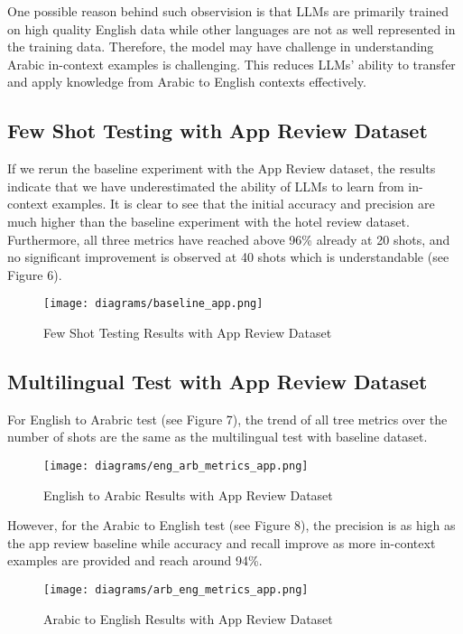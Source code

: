 \documentclass[sigconf, nonacm]{acmart}
\theoremstyle{definition}
\begin{document}
One possible reason behind such observision is that LLMs are primarily trained on high quality English data while other languages are not as well represented in the training data. Therefore, the model may have challenge in understanding Arabic in-context examples is challenging. This reduces LLMs' ability to transfer and apply knowledge from Arabic to English contexts effectively.

\subsection{Few Shot Testing with App Review Dataset}

If we rerun the baseline experiment with the App Review dataset, the results indicate that we have underestimated the ability of LLMs to learn from in-context examples. It is clear to see that the initial accuracy and precision are much higher than the baseline experiment with the hotel review dataset. Furthermore, all three metrics have reached above 96\% already at 20 shots, and no significant improvement is observed at 40 shots which is understandable (see Figure 6).

\begin{figure}[h]
  \centering
  \texttt{[image: diagrams/baseline\_app.png]}
  \caption{Few Shot Testing Results with App Review Dataset}
\end{figure}

\subsection{Multilingual Test with App Review Dataset}

For English to Arabric test (see Figure 7), the trend of all tree metrics over the number of shots are the same as the multilingual test with baseline dataset.

\begin{figure}[h]
  \centering
  \texttt{[image: diagrams/eng\_arb\_metrics\_app.png]}
  \caption{English to Arabic Results with App Review Dataset}
\end{figure}

However, for the Arabic to English test (see Figure 8), the precision is as high as the app review baseline while accuracy and recall improve as more in-context examples are provided and reach around 94\%.

\begin{figure}[h]
  \centering
  \texttt{[image: diagrams/arb\_eng\_metrics\_app.png]}
  \caption{Arabic to English Results with App Review Dataset}
\end{figure}
\end{document}
